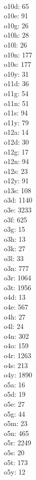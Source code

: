 \begin{multicols}{8}
  \\ o10d: 65
  \\ o10e: 91
  \\ o10g: 26
  \\ o10h: 28
  \\ o10l: 26
  \\ o10n: 177
  \\ o10s: 177
  \\ o10y: 31
  \\ o11d: 36
  \\ o11g: 54
  \\ o11n: 51
  \\ o11s: 94
  \\ o11y: 79
  \\ o12a: 14
  \\ o12d: 30
  \\ o12g: 17
  \\ o12n: 94
  \\ o12s: 23
  \\ o12y: 91
  \\ o13s: 108
  \\ o3d: 1140
  \\ o3e: 3233
  \\ o3f: 625
  \\ o3g: 15
  \\ o3h: 13
  \\ o3k: 27
  \\ o3l: 33
  \\ o3n: 777
  \\ o3r: 1064
  \\ o3t: 1956
  \\ o4d: 13
  \\ o4e: 567
  \\ o4h: 27
  \\ o4l: 24
  \\ o4n: 302
  \\ o4o: 159
  \\ o4r: 1263
  \\ o4s: 213
  \\ o4y: 1890
  \\ o5a: 16
  \\ o5d: 19
  \\ o5e: 27
  \\ o5g: 44
  \\ o5m: 23
  \\ o5n: 465
  \\ o5r: 2249
  \\ o5s: 20
  \\ o5t: 173
  \\ o5y: 12

\end{multicols}
